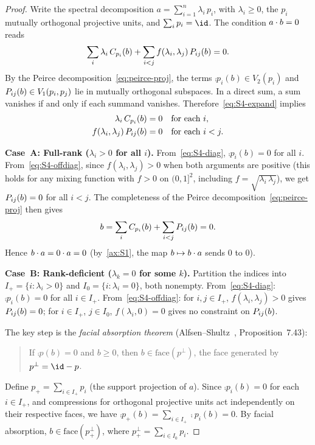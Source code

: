 \begin{proof}
Write the spectral decomposition $a = \sum_{i=1}^{n}
\lambda_{i}\, p_{i}$, with $\lambda_{i} \geq 0$, the $p_{i}$
mutually orthogonal projective units, and $\sum_{i} p_{i} = \id$.
The condition $\sp{a}{b} = 0$ reads
\begin{equation}\label{eq:S4-expand}
  \sum_{i} \lambda_{i}\, \comp{p_{i}}(b)
  + \sum_{i < j} f(\lambda_{i}, \lambda_{j})\, \peirce{ij}(b)
  = 0.
\end{equation}
By the Peirce decomposition~\eqref{eq:peirce-proj}, the terms
$\comp{p_{i}}(b) \in V_{2}(p_{i})$ and
$\peirce{ij}(b) \in V_{1}(p_{i}, p_{j})$ lie in mutually
orthogonal subspaces.  In a direct sum, a sum vanishes if and only if
each summand vanishes.  Therefore~\eqref{eq:S4-expand} implies
\begin{align}
  \lambda_{i}\, \comp{p_{i}}(b) &= 0
  \quad \text{for each } i,
  \label{eq:S4-diag}\\
  f(\lambda_{i}, \lambda_{j})\, \peirce{ij}(b) &= 0
  \quad \text{for each } i < j.
  \label{eq:S4-offdiag}
\end{align}

\medskip
\noindent\textbf{Case~A: Full-rank ($\lambda_{i} > 0$ for all $i$).}
From~\eqref{eq:S4-diag}, $\comp{p_{i}}(b) = 0$ for all $i$.
From~\eqref{eq:S4-offdiag}, since $f(\lambda_{i}, \lambda_{j}) > 0$
when both arguments are positive (this holds for any mixing function
with $f > 0$ on $(0,1]^{2}$, including
$f = \sqrt{\lambda_{i}\, \lambda_{j}}$), we get
$\peirce{ij}(b) = 0$ for all $i < j$.  The completeness of the Peirce
decomposition~\eqref{eq:peirce-proj} then gives
\[
  b = \sum_{i} \comp{p_{i}}(b) + \sum_{i < j} \peirce{ij}(b) = 0.
\]
Hence $\sp{b}{a} = \sp{0}{a} = 0$ (by~\ref{ax:S1}, the map
$b \mapsto \sp{b}{a}$ sends $0$ to $0$).

\medskip
\noindent\textbf{Case~B: Rank-deficient ($\lambda_{k} = 0$
for some $k$).}
Partition the indices into $I_{+} = \{i : \lambda_{i} > 0\}$ and
$I_{0} = \{i : \lambda_{i} = 0\}$, both nonempty.
From~\eqref{eq:S4-diag}: $\comp{p_{i}}(b) = 0$ for all $i \in I_{+}$.
From~\eqref{eq:S4-offdiag}: for $i, j \in I_{+}$,
$f(\lambda_{i}, \lambda_{j}) > 0$ gives
$\peirce{ij}(b) = 0$; for $i \in I_{+}$, $j \in I_{0}$,
$f(\lambda_{i}, 0) = 0$ gives no constraint on
$\peirce{ij}(b)$.

The key step is the \emph{facial absorption theorem}
(Alfsen--Shultz~\cite{AlfsenShultz2003}, Proposition~7.43):
\begin{quote}
  If $\comp{p}(b) = 0$ and $b \geq 0$, then
  $b \in \mathrm{face}(p^{\perp})$, the face generated by
  $p^{\perp} = \id - p$.
\end{quote}
Define $p_{+} = \sum_{i \in I_{+}} p_{i}$ (the support projection of
$a$).  Since $\comp{p_{i}}(b) = 0$ for each $i \in I_{+}$, and
compressions for orthogonal projective units act independently on
their respective faces, we have
$\comp{p_{+}}(b) = \sum_{i \in I_{+}} \comp{p_{i}}(b) = 0$.
By facial absorption, $b \in \mathrm{face}(p_{+}^{\perp})$, where
$p_{+}^{\perp} = \sum_{i \in I_{0}} p_{i}$.


\end{proof}
